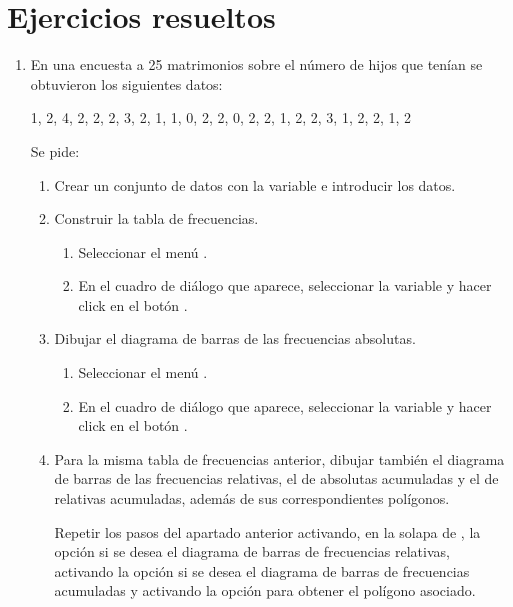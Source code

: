 \section{Ejercicios resueltos}
\begin{enumerate}[leftmargin=*]

\item  En una encuesta a 25 matrimonios sobre el número de hijos que tenían se obtuvieron los siguientes datos:
\begin{center}
1, 2, 4, 2, 2, 2, 3, 2, 1, 1, 0, 2, 2, 0, 2, 2, 1, 2, 2, 3, 1, 2, 2, 1, 2
\end{center}
Se pide:
\begin{enumerate}
\item Crear un conjunto de datos con la variable  e introducir los datos.

\item Construir la tabla de frecuencias.
\begin{indicacion}{
\begin{enumerate}
\item Seleccionar el menú  .
\item En el cuadro de diálogo que aparece, seleccionar la variable  y hacer click en el botón
.
\end{enumerate}}
\end{indicacion}

\item  Dibujar el diagrama de barras de las frecuencias absolutas.
\begin{indicacion}{
\begin{enumerate}
\item Seleccionar el menú .
\item En el cuadro de diálogo que aparece, seleccionar la variable  y hacer click en el botón
.
\end{enumerate}}
\end{indicacion}

\item Para la misma tabla de frecuencias anterior, dibujar también el diagrama de barras de las frecuencias relativas,
el de absolutas acumuladas y el de relativas acumuladas, además de sus correspondientes polígonos.
\begin{indicacion}{Repetir los pasos del apartado anterior activando, en la solapa de ,
la opción  si se desea el diagrama de barras de frecuencias relativas, activando la opción
 si se desea el diagrama de barras de frecuencias acumuladas y activando la opción
 para obtener el polígono asociado.}
\end{indicacion}
\end{enumerate}


\end{enumerate}

